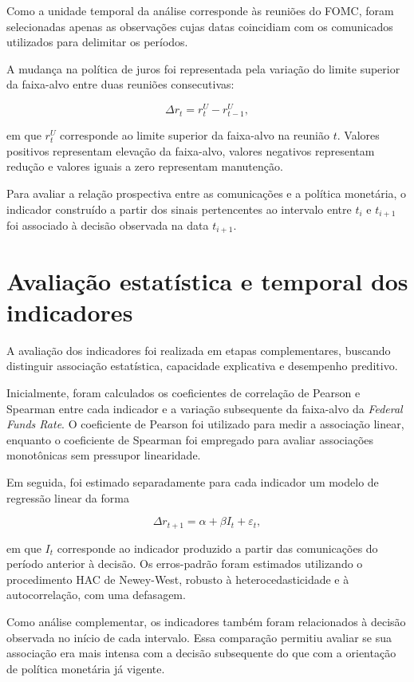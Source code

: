 Como a unidade temporal da análise corresponde às reuniões do FOMC, foram
selecionadas apenas as observações cujas datas coincidiam com os comunicados
utilizados para delimitar os períodos.

A mudança na política de juros foi representada pela variação do limite superior
da faixa-alvo entre duas reuniões consecutivas:

\[
\Delta r_t
=
r^U_t-r^U_{t-1},
\]

em que $r^U_t$ corresponde ao limite superior da faixa-alvo na reunião $t$.
Valores positivos representam elevação da faixa-alvo, valores negativos
representam redução e valores iguais a zero representam manutenção.

Para avaliar a relação prospectiva entre as comunicações e a política
monetária, o indicador construído a partir dos sinais pertencentes ao intervalo
entre $t_i$ e $t_{i+1}$ foi associado à decisão observada na data
$t_{i+1}$.

\section{Avaliação estatística e temporal dos indicadores}

A avaliação dos indicadores foi realizada em etapas complementares, buscando
distinguir associação estatística, capacidade explicativa e desempenho
preditivo.

Inicialmente, foram calculados os coeficientes de correlação de Pearson e
Spearman entre cada indicador e a variação subsequente da faixa-alvo da
\textit{Federal Funds Rate}. O coeficiente de Pearson foi utilizado para medir
a associação linear, enquanto o coeficiente de Spearman foi empregado para
avaliar associações monotônicas sem pressupor linearidade.

Em seguida, foi estimado separadamente para cada indicador um modelo de regressão
linear da forma

\[
\Delta r_{t+1}
=
\alpha+\beta I_t+\varepsilon_t,
\]

em que $I_t$ corresponde ao indicador produzido a partir das comunicações do
período anterior à decisão. Os erros-padrão foram estimados utilizando o
procedimento HAC de Newey-West, robusto à heterocedasticidade e à
autocorrelação, com uma defasagem.

Como análise complementar, os indicadores também foram relacionados à decisão
observada no início de cada intervalo. Essa comparação permitiu avaliar se sua
associação era mais intensa com a decisão subsequente do que com a orientação
de política monetária já vigente.

